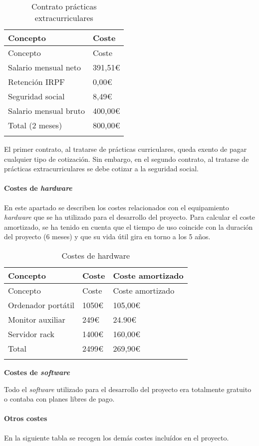 \begin{longtable}[]{@{}ll@{}}
\toprule
Concepto & Coste\tabularnewline
\midrule
\endfirsthead
\toprule
Concepto & Coste\tabularnewline
\midrule
\endhead
Salario mensual neto & 391,51\euro{}\tabularnewline
Retención IRPF & 0,00\euro{}\tabularnewline
Seguridad social & 8,49\euro{}\tabularnewline
Salario mensual bruto & 400,00\euro{}\tabularnewline
Total (2 meses) & 800,00\euro{}\tabularnewline
\bottomrule
\caption{Contrato prácticas extracurriculares}
\end{longtable}

El primer contrato, al tratarse de prácticas curriculares, queda exento
de pagar cualquier tipo de cotización. Sin embargo, en el segundo
contrato, al tratarse de prácticas extracurriculares se debe cotizar a
la seguridad social.


\paragraph{Costes de \emph{hardware}}

En este apartado se describen los costes relacionados con el
equipamiento \emph{hardware} que se ha utilizado para el desarrollo del
proyecto. Para calcular el coste amortizado, se ha tenido en cuenta que
el tiempo de uso coincide con la duración del proyecto (6 meses) y que
su vida útil gira en torno a los 5 años.

\begin{longtable}[]{@{}lll@{}}
\toprule
Concepto & Coste & Coste amortizado\tabularnewline
\midrule
\endfirsthead
\toprule
Concepto & Coste & Coste amortizado\tabularnewline
\midrule
\endhead
Ordenador portátil & 1050\euro{} & 105,00\euro{}\tabularnewline
Monitor auxiliar & 249\euro{} & 24.90\euro{}\tabularnewline
Servidor rack & 1400\euro{} & 160,00\euro{}\tabularnewline
Total & 2499\euro{} & 269,90\euro{}\tabularnewline
\bottomrule
\caption{Costes de hardware}\tabularnewline
\end{longtable}

\textbf{Costes de \emph{software}}

Todo el \emph{software} utilizado para el desarrollo del proyecto era
totalmente gratuito o contaba con planes libres de pago.

\paragraph{Otros costes}

En la siguiente tabla se recogen los demás costes incluídos en el
proyecto.

